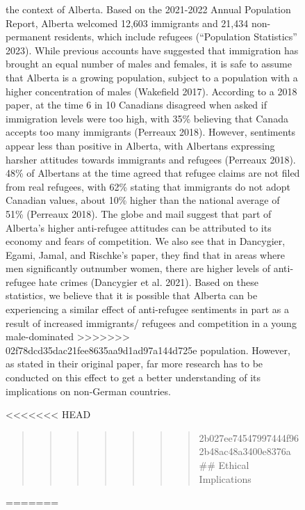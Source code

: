 \documentclass[
]{article}
\begin{document}
\begin{figure}
the context of Alberta. Based on the 2021-2022 Annual Population Report,
Alberta welcomed 12,603 immigrants and 21,434 non-permanent residents,
which include refugees ({``Population Statistics''} 2023). While
previous accounts have suggested that immigration has brought an equal
number of males and females, it is safe to assume that Alberta is a
growing population, subject to a population with a higher concentration
of males (Wakefield 2017). According to a 2018 paper, at the time 6 in
10 Canadians disagreed when asked if immigration levels were too high,
with 35\% believing that Canada accepts too many immigrants (Perreaux
2018). However, sentiments appear less than positive in Alberta, with
Albertans expressing harsher attitudes towards immigrants and refugees
(Perreaux 2018). 48\% of Albertans at the time agreed that refugee
claims are not filed from real refugees, with 62\% stating that
immigrants do not adopt Canadian values, about 10\% higher than the
national average of 51\% (Perreaux 2018). The globe and mail suggest
that part of Alberta's higher anti-refugee attitudes can be attributed
to its economy and fears of competition. We also see that in Dancygier,
Egami, Jamal, and Rischke's paper, they find that in areas where men
significantly outnumber women, there are higher levels of anti-refugee
hate crimes (Dancygier et al. 2021). Based on these statistics, we
believe that it is possible that Alberta can be experiencing a similar
effect of anti-refugee sentiments in part as a result of increased
immigrants/ refugees and competition in a young male-dominated
>>>>>>> 02f78dcd35dac21fee8635aa9d1ad97a144d725e
population. However, as stated in their original paper, far more
research has to be conducted on this effect to get a better
understanding of its implications on non-German countries.

<<<<<<< HEAD
\begin{quote}
\begin{quote}
\begin{quote}
\begin{quote}
\begin{quote}
\begin{quote}
\begin{quote}
2b027ee74547997444f962b48ac48a3400e8376a \#\# Ethical Implications
\end{quote}
\end{quote}
\end{quote}
\end{quote}
\end{quote}
\end{quote}
\end{quote}
=======
\hypertarget{ethical-implications}{%
}
\end{figure}
\end{document}
